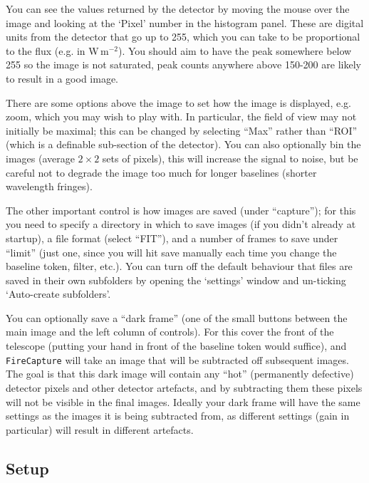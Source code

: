 \documentclass[11pt]{article}
\begin{document}
You can see the values returned by the detector by moving the mouse over the image and looking at the `Pixel' number in the histogram panel. These are digital units from the detector that go up to 255, which you can take to be proportional to the flux (e.g. in W\,m$^{-2}$). You should aim to have the peak somewhere below 255 so the image is not saturated, peak counts anywhere above 150-200 are likely to result in a good image.

There are some options above the image to set how the image is displayed, e.g. zoom, which you may wish to play with. In particular, the field of view may not initially be maximal; this can be changed by selecting ``Max'' rather than ``ROI'' (which is a definable sub-section of the detector). You can also optionally bin the images (average $2 \times 2$ sets of pixels), this will increase the signal to noise, but be careful not to degrade the image too much for longer baselines (shorter wavelength fringes).

The other important control is how images are saved (under ``capture''); for this you need to specify a directory in which to save images (if you didn't already at startup), a file format (select ``FIT''), and a number of frames to save under ``limit'' (just one, since you will hit save manually each time you change the baseline token, filter, etc.). You can turn off the default behaviour that files are saved in their own subfolders by opening the `settings' window and un-ticking `Auto-create subfolders'.

You can optionally save a ``dark frame'' (one of the small buttons between the main image and the left column of controls). For this cover the front of the telescope (putting your hand in front of the baseline token would suffice), and \texttt{FireCapture} will take an image that will be subtracted off subsequent images. The goal is that this dark image will contain any ``hot'' (permanently defective) detector pixels and other detector artefacts, and by subtracting them these pixels will not be visible in the final images. Ideally your dark frame will have the same settings as the images it is being subtracted from, as different settings (gain in particular) will result in different artefacts.

\clearpage

\subsection{Setup}\label{sec:setup}
\end{document}
